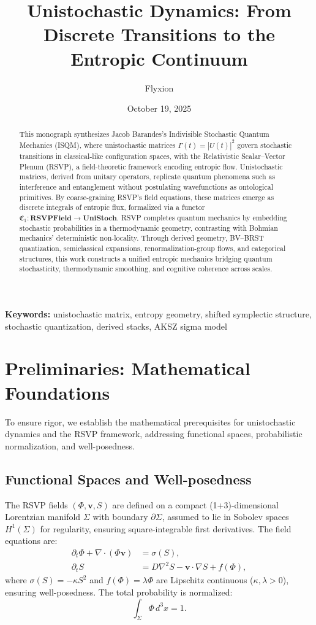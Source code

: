 \documentclass[12pt]{article}
\title{\textbf{Unistochastic Dynamics: From Discrete Transitions to the Entropic Continuum}}
\author{Flyxion}
\date{October 19, 2025}
\begin{document}
\maketitle

\begin{abstract}
This monograph synthesizes Jacob Barandes’s Indivisible Stochastic Quantum Mechanics (ISQM), where unistochastic matrices \(\Gamma(t) = |U(t)|^2\) govern stochastic transitions in classical-like configuration spaces, with the Relativistic Scalar–Vector Plenum (RSVP), a field-theoretic framework encoding entropic flow. Unistochastic matrices, derived from unitary operators, replicate quantum phenomena such as interference and entanglement without postulating wavefunctions as ontological primitives. By coarse-graining RSVP’s field equations, these matrices emerge as discrete integrals of entropic flux, formalized via a functor \(\mathfrak{C}_1: \mathbf{RSVPField} \to \mathbf{UniStoch}\). RSVP completes quantum mechanics by embedding stochastic probabilities in a thermodynamic geometry, contrasting with Bohmian mechanics’ deterministic non-locality. Through derived geometry, BV–BRST quantization, semiclassical expansions, renormalization-group flows, and categorical structures, this work constructs a unified entropic mechanics bridging quantum stochasticity, thermodynamic smoothing, and cognitive coherence across scales.
\end{abstract}

\noindent\textbf{Keywords:} unistochastic matrix, entropy geometry, shifted symplectic structure, stochastic quantization, derived stacks, AKSZ sigma model

\newpage
\tableofcontents
\newpage

\section{Preliminaries: Mathematical Foundations}

To ensure rigor, we establish the mathematical prerequisites for unistochastic dynamics and the RSVP framework, addressing functional spaces, probabilistic normalization, and well-posedness.

\subsection{Functional Spaces and Well-posedness}

The RSVP fields \((\Phi, \mathbf{v}, S)\) are defined on a compact (1+3)-dimensional Lorentzian manifold \(\Sigma\) with boundary \(\partial \Sigma\), assumed to lie in Sobolev spaces \(H^1(\Sigma)\) for regularity, ensuring square-integrable first derivatives. The field equations are:
\begin{align}
\partial_t \Phi + \nabla \cdot (\Phi \mathbf{v}) &= \sigma(S), \label{eq:PDE1} \\
\partial_t S &= D \nabla^2 S - \mathbf{v} \cdot \nabla S + f(\Phi), \label{eq:PDE2}
\end{align}
where \(\sigma(S) = -\kappa S^2\) and \(f(\Phi) = \lambda \Phi\) are Lipschitz continuous (\(\kappa, \lambda > 0\)), ensuring well-posedness. The total probability is normalized:
\[
\int_\Sigma \Phi \, d^3x = 1.
\]
\end{document}
